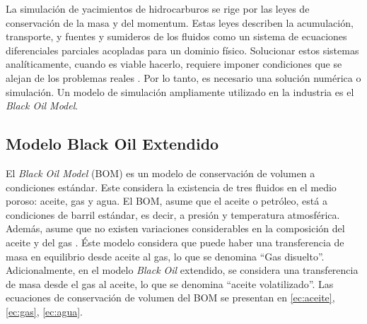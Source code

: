 La simulación de yacimientos de hidrocarburos se rige por las leyes de conservación de la masa y del momentum. Estas leyes describen la acumulación, transporte, y fuentes y sumideros de los fluidos como un sistema de ecuaciones diferenciales parciales acopladas para un dominio físico. Solucionar estos sistemas analíticamente, cuando es viable hacerlo, requiere imponer condiciones que se alejan de los problemas reales \citep{ertekin2001basic}. Por lo tanto, es necesario una solución numérica o simulación. Un modelo de simulación ampliamente utilizado en la industria es el \textit{Black Oil Model}.%


\subsection{Modelo Black Oil Extendido}

El \textit{Black Oil Model} (BOM) es un modelo de conservación de volumen a condiciones estándar. Este considera la existencia de tres fluidos en el medio poroso: aceite, gas y agua. El BOM, asume que el aceite o petróleo, está a condiciones de barril estándar, es decir, a presión y temperatura atmosférica. Además, asume que no existen variaciones considerables en la composición del aceite y del gas \citep{jamal2006petroleum, chen2007reservoir, ertekin2001basic}. Éste modelo considera que puede haber una transferencia de masa en equilibrio desde aceite al gas, lo que se denomina ``Gas disuelto''. Adicionalmente, en el modelo \textit{Black Oil} extendido, se considera una transferencia de masa desde el gas al aceite, lo que se denomina ``aceite volatilizado''. Las ecuaciones de conservación de volumen del BOM se presentan en \ref{ec:aceite}, \ref{ec:gas}, \ref{ec:agua}.

